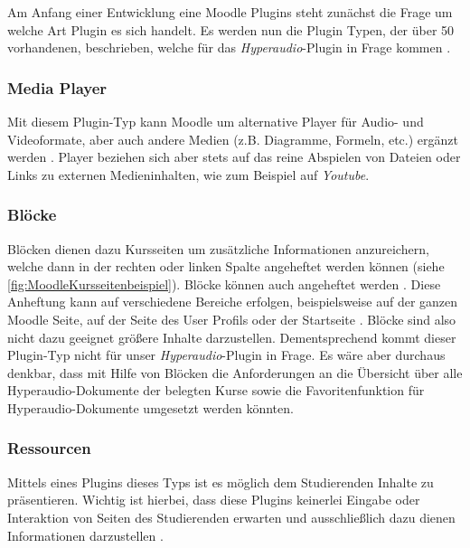 Am Anfang einer Entwicklung eine Moodle Plugins steht zunächst die Frage um welche Art Plugin es sich handelt. Es werden nun die Plugin Typen, der über 50 vorhandenen, beschrieben, welche für das \textit{Hyperaudio}-Plugin in Frage kommen \citep{moodle2017plugin}.

\subsubsection{Media Player}
Mit diesem Plugin-Typ kann Moodle um alternative Player für Audio- und Videoformate, aber auch andere Medien (z.B. Diagramme, Formeln, etc.) ergänzt werden \citep{moodle2017media}. Player beziehen sich aber stets auf das reine Abspielen von Dateien oder Links zu externen Medieninhalten, wie zum Beispiel auf \textit{Youtube}.


\subsubsection{Blöcke}
Blöcken dienen dazu Kursseiten um zusätzliche Informationen anzureichern, welche dann in der rechten oder linken Spalte angeheftet werden können (siehe \ref{fig:MoodleKursseitenbeispiel}). Blöcke können auch \glqq angeheftet\grqq{} werden \citep{moodle2018blocks}. Diese Anheftung kann auf verschiedene Bereiche erfolgen, beispielsweise auf der ganzen Moodle Seite, auf der Seite des User Profils oder der Startseite \citep{moodle2015blocksettings}. Blöcke sind also nicht dazu geeignet größere Inhalte darzustellen. Dementsprechend kommt dieser Plugin-Typ nicht für unser \textit{Hyperaudio}-Plugin in Frage. Es wäre aber durchaus denkbar, dass mit Hilfe von Blöcken die Anforderungen an die Übersicht über alle Hyperaudio-Dokumente der belegten Kurse sowie die Favoritenfunktion für Hyperaudio-Dokumente umgesetzt werden könnten.  


\subsubsection{Ressourcen}
Mittels eines Plugins dieses Typs ist es möglich dem Studierenden Inhalte zu präsentieren. Wichtig ist hierbei, dass diese Plugins keinerlei Eingabe oder Interaktion von Seiten des Studierenden erwarten und ausschließlich dazu dienen Informationen darzustellen \citep{wild2017moodle}.


